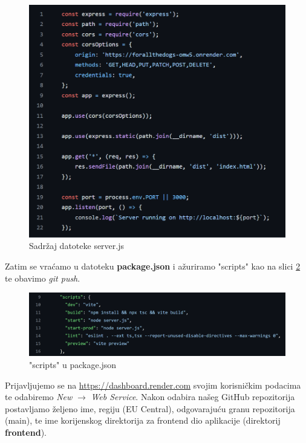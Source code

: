 			\begin{figure}[H]
				\includegraphics[scale=0.6]{slike/server_js.PNG} 
				\centering
				\caption{Sadržaj datoteke server.js}
				\label{server_js}
			\end{figure}
			
			Zatim se vraćamo u datoteku \textbf{package.json} i ažuriramo "scripts" kao na slici \ref{scripts} te obavimo \textit{git push}.
			
			\begin{figure}[H]
				\includegraphics[scale=0.4]{slike/scripts.PNG} 
				\centering
				\caption{"scripts" u package.json}
				\label{scripts}
			\end{figure}
			
			Prijavljujemo se na \url{https://dashboard.render.com} svojim korisničkim podacima te odabiremo \textit{New} $\rightarrow$ \textit{Web Service}. Nakon odabira našeg GitHub repozitorija postavljamo željeno ime, regiju (EU Central), odgovarajuću granu repozitorija (main), te ime korijenskog direktorija za frontend dio aplikacije (direktorij \textbf{frontend}).
			
